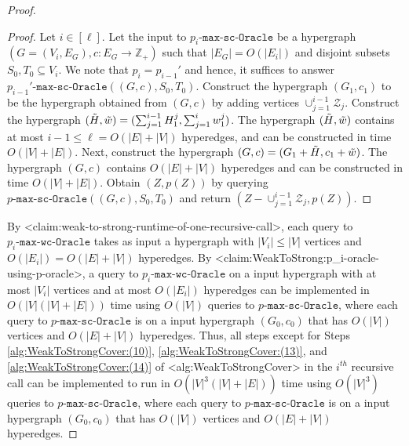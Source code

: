 \documentclass{article}
\def\Cref#1{<#1>}%
\newcommand{\zeros}{\ensuremath{\mathcal{Z}}\xspace}
\newcommand{\functionMaximizationOracle}[1]{\ensuremath{{#1}\text{-}\mathtt{max}\text{-}\mathtt{wc}\text{-}\mathtt{Oracle}}\xspace}
\newcommand{\functionMaximizationOracleStrongCover}[1]{\ensuremath{{#1}\text{-}\mathtt{max}\text{-}\mathtt{sc}\text{-}\mathtt{Oracle}}\xspace}
\providecommand{\Z}{\mathbb{Z}}
\providecommand{\R}{\mathbb{R}}
\begin{document}
\begin{proof}
\begin{proof}
Let $i\in [\ell]$. Let the input to \functionMaximizationOracleStrongCover{p_i} be a hypergraph $(G = (V_i, E_G), c:E_G\rightarrow\Z_+)$ such that $|E_G| = O(|E_i|)$ and disjoint subsets $S_0, T_0\subseteq V_i$. 
We note that $p_i=p_{i-1}'$ and hence, it suffices to answer $\functionMaximizationOracleStrongCover{p_{i-1}'}((G, c), S_0, T_0)$. 
Construct the hypergraph $(G_1, c_1)$ to be the hypergraph obtained from $(G,c)$ by adding vertices $\cup_{j=1}^{i-1}\zeros_{j}$. 
Construct the hypergraph $(\Tilde{H}, \Tilde{w})=(\sum_{j=1}^{i-1}H_1^j, \sum_{j=1}^i w_1^j)$. The hypergraph $(\Tilde{H}, \Tilde{w})$ contains at most $i - 1 \leq \ell = O(|E| + |V|)$ hyperedges, and can be constructed in time $O(|V|+|E|)$. 
Next, construct the hypergraph $(G, c)=(G_1+\Tilde{H}, c_1+\Tilde{w})$. The hypergraph $(G, c)$ contains $O(|E|+|V|)$ hyperedges and can be constructed in time $O(|V|+|E|)$. 
Obtain $(Z, p(Z))$ by querying $\functionMaximizationOracleStrongCover{p}((G, c), S_0, T_0)$ and return $(Z-\cup_{j=1}^{i-1}\zeros_{j}, p(Z))$. 
\end{proof}

By \Cref{claim:weak-to-strong-runtime-of-one-recursive-call}, each query to \functionMaximizationOracle{p_i} takes as input a hypergraph with $|V_i|\le |V|$ vertices and $O(|E_i|) = O(|E|+|V|)$ hyperedges. 
By \Cref{claim:WeakToStrong:p_i-oracle-using-p-oracle}, a query to \functionMaximizationOracle{p_i} on a input hypergraph with at most $|V_i|$ vertices and at most $O(|E_i|)$ hyperedges 
can be implemented in $O(|V|(|V| + |E|))$  time using $O(|V|)$ queries to \functionMaximizationOracleStrongCover{p}, where each query to \functionMaximizationOracleStrongCover{p} is on a input hypergraph $(G_0, c_0)$ that has $O(|V|)$ vertices and $O(|E|+|V|)$ hyperedges. 
Thus, all steps except for Steps \ref{alg:WeakToStrongCover:(10)}, \ref{alg:WeakToStrongCover:(13)}, and \ref{alg:WeakToStrongCover:(14)} of \Cref{alg:WeakToStrongCover} in the $i^{th}$ recursive call can be implemented to run in $O(|V|^3(|V| + |E|))$ time using $O(|V|^3)$ queries to \functionMaximizationOracleStrongCover{p}, where each query to \functionMaximizationOracleStrongCover{p} is on a input hypergraph $(G_0, c_0)$ that has $O(|V|)$ vertices and $O(|E|+|V|)$ hyperedges. 


\end{proof}
\end{document}
